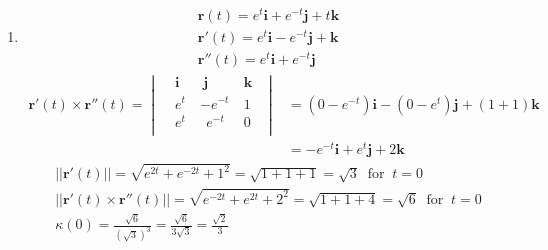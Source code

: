 \documentclass[12pt]{amsart}
\begin{document}
\begin{enumerate}
	\item
		\begin{align*}	
			&\mathbf{r}(t)=e^t\mathbf{i}+e^{-t}\mathbf{j}+t\mathbf{k} \\
			&\mathbf{r}'(t)=e^t\mathbf{i}-e^{-t}\mathbf{j}+\mathbf{k} \\
			&\mathbf{r}''(t)=e^t\mathbf{i}+e^{-t}\mathbf{j}
		\end{align*}
		\begin{align*}
			\mathbf{r}'(t)\times\mathbf{r}''(t)=
				\begin{vmatrix}
					&\mathbf{i} \ &\ \mathbf{j} \ &\mathbf{k} \ \ \\
					&e^t \ &-e^{-t} \ &1 \ \ \\
					&e^t \ &\ \ e^{-t} \ &0 \ \ \\
				\end{vmatrix} 
			&=(0-e^{-t})\mathbf{i}-(0-e^t)\mathbf{j}+(1+1)\mathbf{k} \\
			&=-e^{-t}\mathbf{i}+e^t\mathbf{j}+2\mathbf{k}
		\end{align*}
		\begin{align*}
			&||\mathbf{r}'(t)||=\sqrt{e^{2t}+e^{-2t}+1^2} =\sqrt{1+1+1}=\sqrt{3} \ \text{ for } \ t=0 \\
			&||\mathbf{r}'(t)\times\mathbf{r}''(t)||=\sqrt{e^{-2t}+e^{2t}+2^2}=\sqrt{1+1+4}=\sqrt{6} \ \text{ for } \ 			t=0 \\
			&\kappa(0)=\frac{\sqrt{6}}{(\sqrt{3})^3}=\frac{\sqrt{6}}{3\sqrt{3}}=\frac{\sqrt{2}}{3} \\
		\end{align*}	
		

\end{enumerate}
\end{document}
